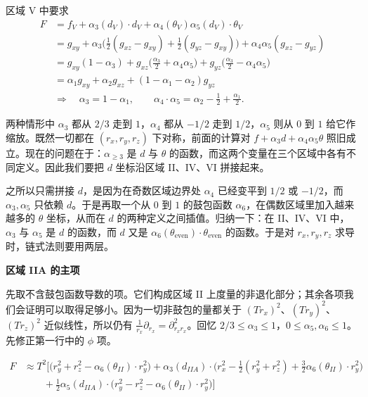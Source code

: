 区域 V 中要求
\begin{align*}
F&=f_V+\alpha_3(d_V)\cdot d_V+\alpha_4(\theta_V)\alpha_5(d_V)\cdot\theta_V\\
&=g_{xy}+\alpha_3\Big(\frac12(g_{xz}-g_{xy})+\frac12(g_{yz}-g_{xy})\Big)+\alpha_4\alpha_5(g_{xz}-g_{yz})\\
&=g_{xy}(1-\alpha_3)+g_{xz}\Big(\frac{\alpha_3}{2}+\alpha_4\alpha_5\Big)+g_{yz}\Big(\frac{\alpha_3}{2}-\alpha_4\alpha_5\Big)\\
&=\alpha_1g_{xy}+\alpha_2g_{xz}+(1-\alpha_1-\alpha_2)g_{yz}\\
&\Longrightarrow\quad\alpha_3=1-\alpha_1,\qquad\alpha_4\cdot\alpha_5=\alpha_2-\frac12+\frac{\alpha_1}{2}.
\end{align*}

两种情形中 $\alpha_3$ 都从 $2/3$ 走到 $1$，$\alpha_4$ 都从 $-1/2$ 走到 $1/2$，$\alpha_5$ 则从 $0$ 到 $1$ 给它作缩放。既然一切都在 $(r_x,r_y,r_z)$ 下对称，前面的计算对 $f+\alpha_3d+\alpha_4\alpha_5\theta$ 照旧成立。现在的问题在于：$\alpha_{\ge3}$ 是 $d$ 与 $\theta$ 的函数，而这两个变量在三个区域中各有不同定义。因此我们要把 $d$ 坐标沿区域 II、IV、VI 拼接起来。

之所以只需拼接 $d$，是因为在奇数区域边界处 $\alpha_4$ 已经变平到 $1/2$ 或 $-1/2$，而 $\alpha_3,\alpha_5$ 只依赖 $d$。于是再取一个从 $0$ 到 $1$ 的鼓包函数 $\alpha_6$，在偶数区域里加入越来越多的 $\theta$ 坐标，从而在 $d$ 的两种定义之间插值。归纳一下：在 II、IV、VI 中，$\alpha_3$ 与 $\alpha_5$ 是 $d$ 的函数，而 $d$ 又是 $\alpha_6(\theta_{\text{even}})\cdot\theta_{\text{even}}$ 的函数。于是对 $r_x,r_y,r_z$ 求导时，链式法则要用两层。

\medskip
\noindent\textbf{区域 IIA 的主项}\par
先取不含鼓包函数导数的项。它们构成区域 II 上度量的非退化部分；其余各项我们会证明可以取得足够小。因为一切非鼓包的量都关于 $(Tr_x)^2$、$(Tr_y)^2$、$(Tr_z)^2$ 近似线性，所以仍有 $\frac{1}{r_x}\partial_{r_x}=\partial^2_{r_xr_x}$。回忆 $2/3\le\alpha_3\le1$，$0\le\alpha_5,\alpha_6\le1$。先修正第一行中的 $\phi$ 项。

\begin{align*}
F&\approx T^2\Big[\big(r_y^2+r_z^2-\alpha_6(\theta_{II})\cdot r_y^2\big)
+\alpha_3(d_{IIA})\cdot\Big(r_x^2-\frac12(r_y^2+r_z^2)+\frac32\alpha_6(\theta_{II})\cdot r_y^2\Big)\\
&\qquad+\frac12\alpha_5(d_{IIA})\cdot\big(r_y^2-r_z^2-\alpha_6(\theta_{II})\cdot r_y^2\big)\Big]
\end{align*}

